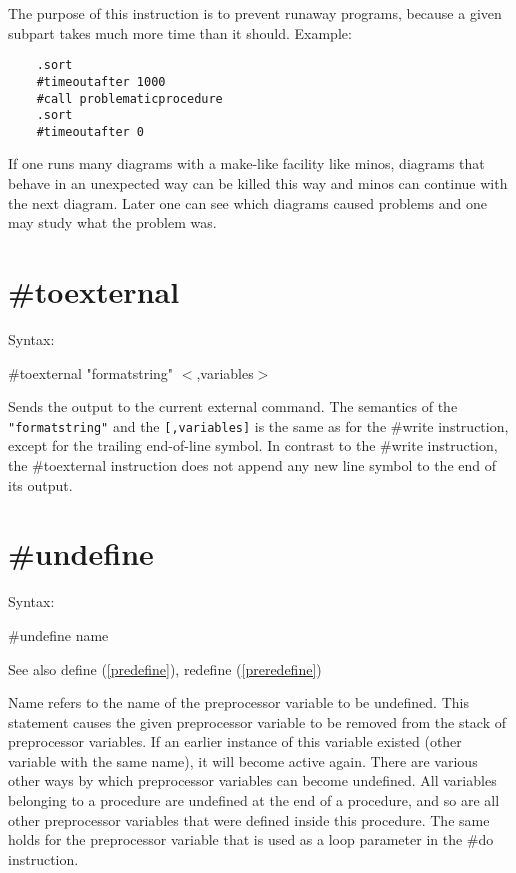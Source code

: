 The purpose of this instruction is to prevent runaway programs, because a 
given subpart takes much more time than it should. Example:
\begin{verbatim}
    .sort
	#timeoutafter 1000
	#call problematicprocedure
	.sort
	#timeoutafter 0
\end{verbatim}
If one runs many diagrams with a make-like facility like minos, diagrams 
that behave in an unexpected way can be killed this way and minos can 
continue with the next diagram. Later one can see which diagrams caused 
problems and one may study what the problem was.


\section{\#toexternal}
\label{pretoexternal}

\noindent Syntax:

\#toexternal "formatstring" $<$,variables$>$

\noindent Sends the output to the current external 
command. The semantics of the \verb|"formatstring"| and the
\verb|[,variables]| is the same as for the \#write 
instruction, except for the trailing end-of-line symbol. In contrast to the 
\#write instruction, the \#toexternal instruction does not append any new 
line symbol to the end of its output.


\section{\#undefine}
\label{preundefine}

\noindent Syntax:

\#undefine name
 
\noindent See also define (\ref{predefine}), redefine 
(\ref{preredefine})

\noindent {} Name refers to the name of the 
preprocessor variable to be undefined. This 
statement causes the given preprocessor variable to be removed from the 
stack of preprocessor variables. If an earlier instance of this variable 
existed (other variable with the same name), it will become active again. 
There are various other ways by which preprocessor variables can become 
undefined. All variables belonging to a procedure are undefined at the end 
of a procedure, and so are all other preprocessor variables that were 
defined inside this procedure. The same holds for the preprocessor variable 
that is used as a loop parameter in the \#do instruction.

